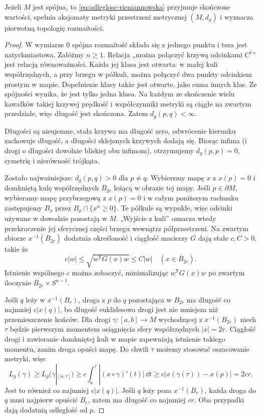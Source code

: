 \begin{twierdzenie}
\label{thm:odleglosc-jest-metryka}
Jeżeli $M$ jest spójna, to \eqref{eq:odleglosc-riemannowska}
przyjmuje skończone wartości, spełnia aksjomaty
metryki przestrzeni metrycznej $(M,d_g)$
i wyznacza pierwotną topologię rozmaitości.
\end{twierdzenie}
\begin{proof}
W wymiarze $0$ spójna rozmaitość składa się z jednego
punktu i teza jest natychmiastowa. Załóżmy $n\geq1$.
Relacja „można połączyć krzywą odcinkami $C^1$” jest
relacją równoważności. Każda jej klasa jest otwarta:
w małej kuli współrzędnych, a przy brzegu w półkuli,
można połączyć dwa punkty odcinkiem prostym w mapie.
Dopełnienie klasy także jest otwarte, jako suma innych
klas. Ze spójności wynika, że jest tylko jedna klasa.
Na każdym ze skończenie wielu kawałków takiej krzywej
prędkość i współczynniki metryki są ciągłe na zwartym
przedziale, więc długość jest skończona.
Zatem $d_g(p,q)<\infty$.

Długości są nieujemne, stała krzywa ma
długość zero, odwrócenie kierunku zachowuje
długość, a długości sklejonych krzywych
dodają się. Biorąc infima (i drogi o długości
dowolnie bliskiej obu infimom), otrzymujemy
$d_g(p,p)=0$, symetrię i nierówność trójkąta.

Zostało najważniejsze: $d_g(p,q)>0$ dla $p\ne q$.
Wybierzmy mapę $x$ z $x(p)=0$ i domkniętą
kulę współrzędnych $\overline B_{2r}$ leżącą
w obrazie tej mapy. Jeśli $p\in\partial M$, wybieramy
mapę przybrzegową z $x(p)=0$ i w całym poniższym
rachunku zastępujemy $B_\rho$ przez
$B_\rho\cap\{x^n\geq0\}$. Te półkule są wypukłe,
więc odcinki używane w dowodzie pozostają w $M$.
„Wyjście z kuli” oznacza wtedy przekroczenie jej
sferycznej części brzegu wewnątrz półprzestrzeni.
Na zwartym zbiorze
$x^{-1}(\overline B_{2r})$ dodatnia określoność
i ciągłość macierzy $G$ dają stałe $c,C>0$,
takie że
\[
 c|w|\leq\sqrt{w^{\mathsf T}G(x)w}\leq C|w|
 \quad (x\in\overline B_{2r}).
\]
Istnienie wspólnego $c$ można zobaczyć,
minimalizując $w^{\mathsf T}G(x)w$ po zwartym
iloczynie $\overline B_{2r}\times S^{n-1}$.

Jeśli $q$ leży w $x^{-1}(B_r)$, droga z $p$
do $q$ pozostająca w $B_{2r}$ ma długość
co najmniej $c|x(q)|$, bo długość euklidesowa
drogi jest nie mniejsza niż przemieszczenie
końców. Dla drogi $\gamma:[a,b]\to M$ wychodzącej
z $x^{-1}(B_{2r})$ niech $\tau$ będzie pierwszym
momentem osiągnięcia sfery współrzędnych $|x|=2r$.
Ciągłość drogi i zawieranie domkniętej kuli w mapie
zapewniają istnienie takiego momentu, zanim droga opuści mapę.
Do chwili $\tau$ możemy stosować oszacowanie metryki, więc
\[
 L_g(\gamma)\geq L_g(\gamma|_{[a,\tau]})
 \geq c\int_a^\tau|(x\circ\gamma)'(t)|\,\dd t
 \geq c|x(\gamma(\tau))-x(p)|=2cr.
\]
Jest to również co najmniej $c|x(q)|$.
Jeśli $q$ leży poza $x^{-1}(B_r)$, każda droga
do $q$ musi najpierw opuścić $B_r$, zatem
ma długość co najmniej $cr$. Oba przypadki
dają dodatnią odległość od $p$.


\end{proof}

